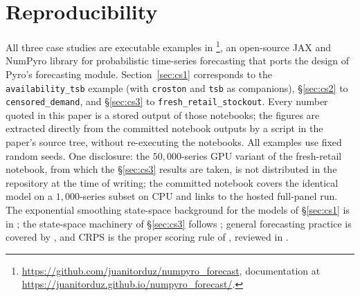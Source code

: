 \section{Reproducibility}\label{sec:repro}

All three case studies are executable examples in \footnote{\url{https://github.com/juanitorduz/numpyro_forecast}, documentation at \url{https://juanitorduz.github.io/numpyro_forecast/}.}, an open-source JAX \citep{bradbury2018jax} and NumPyro \citep{phan2019composable, bingham2019pyro} library for probabilistic time-series forecasting that ports the design of Pyro's forecasting module. Section~\ref{sec:cs1} corresponds to the \texttt{availability\_tsb} example (with \texttt{croston} and \texttt{tsb} as companions), \S\ref{sec:cs2} to \texttt{censored\_demand}, and \S\ref{sec:cs3} to \texttt{fresh\_retail\_stockout}. Every number quoted in this paper is a stored output of those notebooks; the figures are extracted directly from the committed notebook outputs by a script in the paper's source tree, without re-executing the notebooks. All examples use fixed random seeds. One disclosure: the $50{,}000$-series GPU variant of the fresh-retail notebook, from which the \S\ref{sec:cs3} results are taken, is not distributed in the repository at the time of writing; the committed notebook covers the identical model on a $1{,}000$-series subset on CPU and links to the hosted full-panel run. The exponential smoothing state-space background for the models of \S\ref{sec:cs1} is in \citet{hyndman2008forecasting}; the state-space machinery of \S\ref{sec:cs3} follows \citet{durbin2012time}; general forecasting practice is covered by \citet{hyndman2021fpp3}, and CRPS is the proper scoring rule of \citet{gneiting2007strictly}, reviewed in \citet{gneiting2014probabilistic}.

